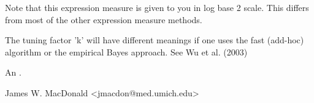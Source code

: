 \begin{Details}\relax
Note that this expression measure is given to you in log base 2
scale. This differs from most of the other expression measure
methods.

The tuning factor 'k' will have different meanings if one uses
the fast (add-hoc) algorithm or the empirical Bayes approach. See
Wu et al. (2003)
\end{Details}
\begin{Value}
An .
\end{Value}
\begin{Author}\relax
James W. MacDonald <jmacdon@med.umich.edu>
\end{Author}
\begin{SeeAlso}\relax
{}
\end{SeeAlso}

